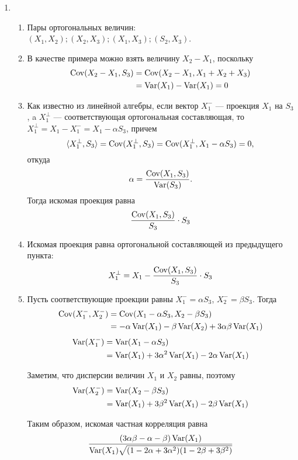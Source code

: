 \begin{enumerate}
\item
\begin{enumerate}
\item Пары ортогональных величин: $(X_1,X_2); (X_2,X_3); (X_1,X_3); (S_2,X_3)$.
\item В качестве примера можно взять величину $X_2-X_1$, поскольку
\begin{align*}
\operatorname{Cov}(X_2-X_1,S_3) &= \operatorname{Cov}(X_2-X_1,X_1+X_2+X_3) \\
&= \operatorname{Var}(X_1)-\operatorname{Var}(X_1)=0
\end{align*}
\item Как известно из линейной алгебры, если вектор $X^-_1$ — проекция $X_1$ на $S_3$,
a $X^{\perp}_1$ — соответствующая ортогональная составляющая, то $X^{\perp}_1=X_1-X^-_1 = X_1-\alpha S_3$,
причем
\[
\langle X^{\perp}_1,S_3\rangle = \operatorname{Cov}(X^{\perp}_1,S_3) = \operatorname{Cov}(X^{\perp}_1,X_1-\alpha S_3) = 0,
\]
откуда
\[
\alpha = \frac{\operatorname{Cov}(X_1,S_3)}{\operatorname{Var}(S_3)}.
\]
Тогда искомая проекция равна
\[
\frac{\operatorname{Cov}(X_1,S_3)}{S_3}\cdot S_3
\]
\item Искомая проекция равна ортогональной составляющей из предыдущего пункта:
\[
X^{\perp}_1 = X_1 - \frac{\operatorname{Cov}(X_1,S_3)}{S_3}\cdot S_3
\]
\item Пусть соответствующие проекции равны $X^-_1 = \alpha S_3$, $X^-_2 = \beta S_3$.
Тогда
\begin{align*}
\operatorname{Cov}(X^-_1,X^-_2) &= \operatorname{Cov}(X_1-\alpha S_3,X_2 - \beta S_3) \\
&=-\alpha\operatorname{Var}(X_1)-\beta\operatorname{Var}(X_2)+3\alpha\beta\operatorname{Var}(X_1)
\end{align*}
\begin{align*}
\operatorname{Var}(X^-_1) &= \operatorname{Var}(X_1 - \alpha S_3)\\
&= \operatorname{Var}(X_1) + 3\alpha^2\operatorname{Var}(X_1) - 2\alpha\operatorname{Var}(X_1)
\end{align*}

Заметим, что дисперсии величин $X_1$ и $X_2$ равны, поэтому
\begin{align*}
\operatorname{Var}(X^-_2) &= \operatorname{Var}(X_2 - \beta S_3)\\
&= \operatorname{Var}(X_1) + 3\beta^2 \operatorname{Var}(X_1) - 2\beta\operatorname{Var}(X_1)
\end{align*}

Таким образом, искомая частная корреляция равна
\[
\frac{(3\alpha\beta - \alpha - \beta)\operatorname{Var}(X_1)}{\operatorname{Var}(X_1)\sqrt{(1 - 2\alpha + 3\alpha^2)(1 - 2\beta + 3\beta^2)}}
\]


\end{enumerate}
\end{enumerate}
